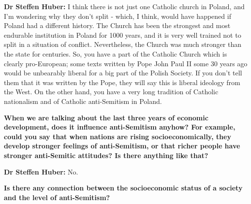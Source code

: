 \textbf{Dr Steffen Huber:} I think there is not just one Catholic church in Poland, and I'm wondering why they don't split - which, I think, would have happened if Poland had a different history. The Church has been the strongest and most endurable institution in Poland for 1000 years, and it is very well trained not to split in a situation of conflict. Nevertheless, the Church was much stronger than the state for centuries. So, you have a part of the Catholic Church which is clearly pro-European; some texts written by Pope John Paul II some 30 years ago would be unbearably liberal for a big part of the Polish Society. If you don't tell them that it was written by the Pope, they will say this is liberal ideology from the West. On the other hand, you have a very long tradition of Catholic nationalism and of Catholic anti-Semitism in Poland. 

\textbf{When we are talking about the last three years of economic development, does it influence anti-Semitism anyhow?  For example, could you say that when nations are rising socioeconomically, they develop stronger feelings of anti-Semitism, or that richer people have stronger anti-Semitic attitudes? Is there anything like that?} 

\textbf{Dr Steffen Huber:} No. 

\textbf{Is there any connection between the socioeconomic status of a society and the level of anti-Semitism?} 

